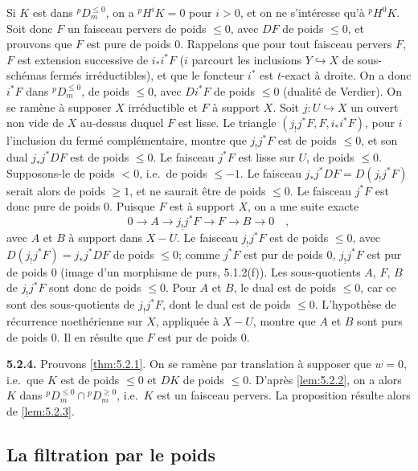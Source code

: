 \documentclass[12pt,a4paper]{article}
\theoremstyle{plain}
\theoremstyle{definition}
\newcommand{\into}{\hookrightarrow}
\begin{document}
Si $K$ est dans ${}^{p}D_{m}^{\leq 0}$, on a ${}^{p}H^{i}K = 0$ pour $i > 0$, et on ne s'int\'{e}resse qu'\`{a} ${}^{p}H^{0}K$. Soit donc $F$ un faisceau pervers de poids $\leq 0$, avec $DF$ de poids $\leq 0$, et prouvons que $F$ est pure de poids $0$. Rappelons que pour tout faisceau pervers $F$, $F$ est extension successive de $i_{*}i^{*}F$ ($i$ parcourt les inclusions $Y \into X$ de sous-sch\'{e}mas ferm\'{e}s irr\'{e}ductibles), et que le foncteur $i^{*}$ est $t$-exact \`{a} droite. On a donc $i^{*}F$ dans ${}^{p}D_{m}^{\leq 0}$, de poids $\leq 0$, avec $Di^{*}F$ de poids $\leq 0$ (dualit\'{e} de Verdier). On se ram\`{e}ne \`{a} supposer $X$ irr\'{e}ductible et $F$ \`{a} support $X$. Soit $j: U \into X$ un ouvert non vide de $X$ au-dessus duquel $F$ est lisse. Le triangle $(j_{!}j^{*}F, F, i_{*}i^{*}F)$, pour $i$ l'inclusion du ferm\'{e} compl\'{e}mentaire, montre que $j_{!}j^{*}F$ est de poids $\leq 0$, et son dual $j_{*}j^{*}DF$ est de poids $\leq 0$. Le faisceau $j^{*}F$ est lisse sur $U$, de poids $\leq 0$. Supposons-le de poids $< 0$, i.e.\ de poids $\leq -1$. Le faisceau $j_{*}j^{*}DF = D(j_{!}j^{*}F)$ serait alors de poids $\geq 1$, et ne saurait \^{e}tre de poids $\leq 0$. Le faisceau $j^{*}F$ est donc pure de poids $0$. Puisque $F$ est \`{a} support $X$, on a une suite exacte
\[
0 \longrightarrow A \longrightarrow j_{!}j^{*}F \longrightarrow F \longrightarrow B \longrightarrow 0\quad,
\]
avec $A$ et $B$ \`{a} support dans $X-U$. Le faisceau $j_{!}j^{*}F$ est de poids $\leq 0$, avec $D(j_{!}j^{*}F) = j_{*}j^{*}DF$ de poids $\leq 0$; comme $j^{*}F$ est pur de poids $0$, $j_{!}j^{*}F$ est pur de poids $0$ (image d'un morphisme de purs, 5.1.2(f)). Les sous-quotients $A$, $F$, $B$ de $j_{!}j^{*}F$ sont donc de poids $\leq 0$. Pour $A$ et $B$, le dual est de poids $\leq 0$, car ce sont des sous-quotients de $j_{!}j^{*}F$, dont le dual est de poids $\leq 0$. L'hypoth\`{e}se de r\'{e}currence noeth\'{e}rienne sur $X$, appliqu\'{e}e \`{a} $X-U$, montre que $A$ et $B$ sont purs de poids $0$. Il en r\'{e}sulte que $F$ est pur de poids $0$.

\noindent\textbf{5.2.4.} Prouvons \ref{thm:5.2.1}. On se ram\`{e}ne par translation \`{a} supposer que $w = 0$, i.e.\ que $K$ est de poids $\leq 0$ et $DK$ de poids $\leq 0$. D'apr\`{e}s \ref{lem:5.2.2}, on a alors $K$ dans ${}^{p}D_{m}^{\leq 0} \cap {}^{p}D_{m}^{\geq 0}$, i.e.\ $K$ est un faisceau pervers. La proposition r\'{e}sulte alors de \ref{lem:5.2.3}.

\subsection{La filtration par le poids}
\end{document}
